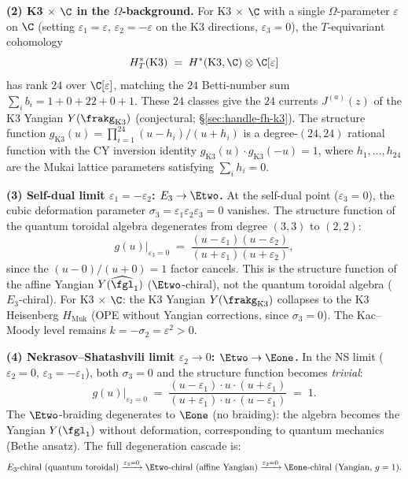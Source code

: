 \medskip
\noindent\textbf{(2) K3 $\times$ $\C$ in the $\Omega$-background.}
For K3 $\times$ $\C$ with a single $\Omega$-parameter $\varepsilon$ on $\C$ (setting $\varepsilon_1 = \varepsilon$, $\varepsilon_2 = -\varepsilon$ on the K3 directions, $\varepsilon_3 = 0$), the $T$-equivariant cohomology
\[
 H^*_T(\mathrm{K3}) \;=\; H^*(\mathrm{K3}, \C) \otimes \C[\varepsilon]
\]
has rank $24$ over $\C[\varepsilon]$, matching the $24$ Betti-number sum $\sum_i b_i = 1 + 0 + 22 + 0 + 1$. These $24$ classes give the $24$ currents $J^{(a)}(z)$ of the K3 Yangian $Y(\frakg_{\mathrm{K3}})$ (conjectural; \S\ref{sec:handle-fh-k3}). The structure function $g_{\mathrm{K3}}(u) = \prod_{i=1}^{24} (u - h_i)/(u + h_i)$ is a degree-$(24, 24)$ rational function with the CY inversion identity $g_{\mathrm{K3}}(u) \cdot g_{\mathrm{K3}}(-u) = 1$, where $h_1, \ldots, h_{24}$ are the Mukai lattice parameters satisfying $\sum_i h_i = 0$.

\medskip
\noindent\textbf{(3) Self-dual limit $\varepsilon_1 = -\varepsilon_2$: $E_3 \to \Etwo$.}
At the self-dual point ($\varepsilon_3 = 0$), the cubic deformation parameter $\sigma_3 = \varepsilon_1 \varepsilon_2 \varepsilon_3 = 0$ vanishes. The structure function of the quantum toroidal algebra degenerates from degree $(3,3)$ to $(2,2)$:
\[
 g(u)\big|_{\varepsilon_3 = 0} \;=\; \frac{(u - \varepsilon_1)(u - \varepsilon_2)}{(u + \varepsilon_1)(u + \varepsilon_2)},
\]
since the $(u - 0)/(u + 0) = 1$ factor cancels. This is the structure function of the affine Yangian $Y(\widehat{\fgl}_1)$ ($\Etwo$-chiral), not the quantum toroidal algebra ($E_3$-chiral). For K3 $\times$ $\C$: the K3 Yangian $Y(\frakg_{\mathrm{K3}})$ collapses to the K3 Heisenberg $H_{\mathrm{Muk}}$ (OPE without Yangian corrections, since $\sigma_3 = 0$). The Kac--Moody level remains $k = -\sigma_2 = \varepsilon^2 > 0$.

\medskip
\noindent\textbf{(4) Nekrasov--Shatashvili limit $\varepsilon_2 \to 0$: $\Etwo \to \Eone$.}
In the NS limit ($\varepsilon_2 = 0$, $\varepsilon_3 = -\varepsilon_1$), both $\sigma_3 = 0$ and the structure function becomes \emph{trivial}:
\[
 g(u)\big|_{\varepsilon_2 = 0} \;=\; \frac{(u - \varepsilon_1) \cdot u \cdot (u + \varepsilon_1)}{(u + \varepsilon_1) \cdot u \cdot (u - \varepsilon_1)} \;=\; 1.
\]
The $\Etwo$-braiding degenerates to $\Eone$ (no braiding): the algebra becomes the Yangian $Y(\fgl_1)$ without deformation, corresponding to quantum mechanics (Bethe ansatz). The full degeneration cascade is:
\[
 E_3 \text{-chiral (quantum toroidal)} \xrightarrow{\varepsilon_3 = 0} \Etwo\text{-chiral (affine Yangian)} \xrightarrow{\varepsilon_2 = 0} \Eone\text{-chiral (Yangian, } g = 1\text{)}.
\]

